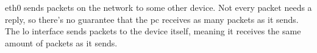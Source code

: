 eth0 sends packets on the network to some other device. Not every packet needs a reply, so there's no guarantee that the pc receives as many packets as it sends.
The lo interface sends packets to the device itself, meaning it receives the same amount of packets as it sends.